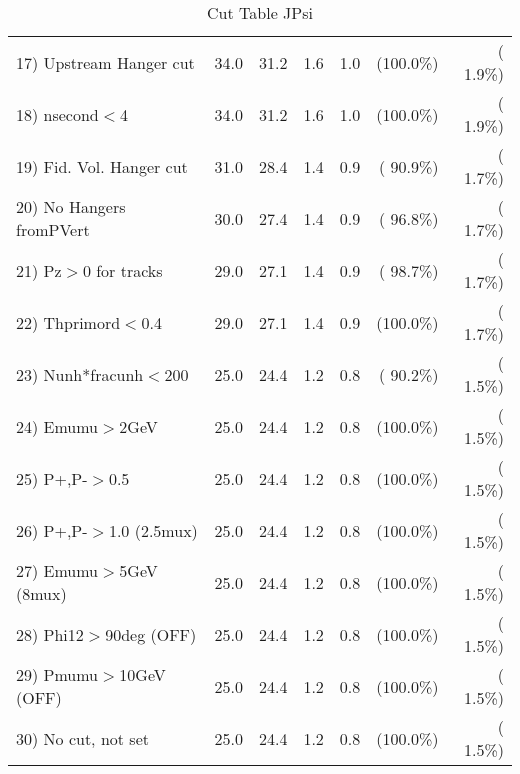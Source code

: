 \begin{table}[h!]
\begin{tabular}{||l||r|r|r|r|r|r||}
 17) Upstream Hanger cut  &         34.0 &         31.2 &          1.6 &          1.0 & (100.0\%) & (  1.9\%) \\
 18) nsecond$<$4          &         34.0 &         31.2 &          1.6 &          1.0 & (100.0\%) & (  1.9\%) \\
 19) Fid. Vol. Hanger cut &         31.0 &         28.4 &          1.4 &          0.9 & ( 90.9\%) & (  1.7\%) \\
 20) No Hangers fromPVert &         30.0 &         27.4 &          1.4 &          0.9 & ( 96.8\%) & (  1.7\%) \\
 21) Pz$>$0 for tracks    &         29.0 &         27.1 &          1.4 &          0.9 & ( 98.7\%) & (  1.7\%) \\
 22) Thprimord$<$0.4      &         29.0 &         27.1 &          1.4 &          0.9 & (100.0\%) & (  1.7\%) \\
 23) Nunh*fracunh$<$200   &         25.0 &         24.4 &          1.2 &          0.8 & ( 90.2\%) & (  1.5\%) \\
 24) Emumu$>$2GeV         &         25.0 &         24.4 &          1.2 &          0.8 & (100.0\%) & (  1.5\%) \\
 25) P+,P-$>$0.5          &         25.0 &         24.4 &          1.2 &          0.8 & (100.0\%) & (  1.5\%) \\
 26) P+,P-$>$1.0 (2.5mux) &         25.0 &         24.4 &          1.2 &          0.8 & (100.0\%) & (  1.5\%) \\
 27) Emumu$>$5GeV  (8mux) &         25.0 &         24.4 &          1.2 &          0.8 & (100.0\%) & (  1.5\%) \\
 28) Phi12$>$90deg  (OFF) &         25.0 &         24.4 &          1.2 &          0.8 & (100.0\%) & (  1.5\%) \\
 29) Pmumu$>$10GeV  (OFF) &         25.0 &         24.4 &          1.2 &          0.8 & (100.0\%) & (  1.5\%) \\
 30) No cut, not set      &         25.0 &         24.4 &          1.2 &          0.8 & (100.0\%) & (  1.5\%) \\
 \hline
 \hline
 \end{tabular}
 \caption{Cut Table  JPsi     }
 \label{tab-cutcohjpsi-mumu_cohrhop}
 \end{table}
